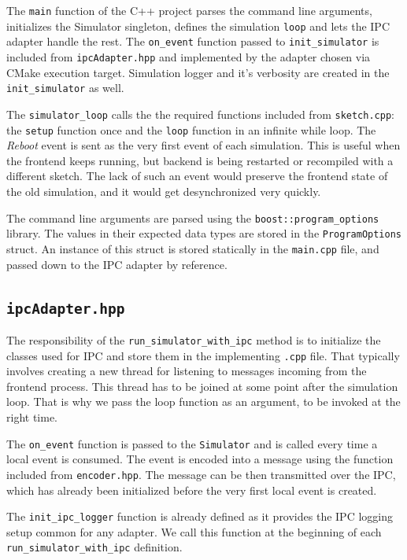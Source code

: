 The \texttt{main} function of the C++ project parses the command line arguments, initializes the Simulator singleton, defines the simulation \texttt{loop} and lets the IPC adapter handle the rest. The \texttt{on\_event} function passed to \texttt{init\_simulator} is included from \texttt{ipcAdapter.hpp} and implemented by the adapter chosen via CMake execution target. Simulation logger and it's verbosity are created in the \texttt{init\_simulator} as well.

The \texttt{simulator\_loop} calls the the required functions included from \texttt{sketch.cpp}: the \texttt{setup} function once and the \texttt{loop} function in an infinite while loop. The \textit{Reboot} event is sent as the very first event of each simulation. This is useful when the frontend keeps running, but backend is being restarted or recompiled with a different sketch. The lack of such an event would preserve the frontend state of the old simulation, and it would get desynchronized very quickly.

The command line arguments are parsed using the \texttt{boost::program\_options} library. The values in their expected data types are stored in the \texttt{ProgramOptions} struct. An instance of this struct is stored statically in the \texttt{main.cpp} file, and passed down to the IPC adapter by reference.

\subsection{\texttt{ipcAdapter.hpp}}

The responsibility of the \texttt{run\_simulator\_with\_ipc} method is to initialize the classes used for IPC and store them in the implementing \texttt{.cpp} file. That typically involves creating a new thread for listening to messages incoming from the frontend process. This thread has to be joined at some point after the simulation loop. That is why we pass the loop function as an argument, to be invoked at the right time.

The \texttt{on\_event} function is passed to the \texttt{Simulator} and is called every time a local event is consumed. The event is encoded into a message using the function included from \texttt{encoder.hpp}. The message can be then transmitted over the IPC, which has already been initialized before the very first local event is created.

The \texttt{init\_ipc\_logger} function is already defined as it provides the IPC logging setup common for any adapter. We call this function at the beginning of each \texttt{run\_simulator\_with\_ipc} definition.

